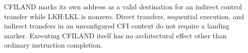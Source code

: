 CFILAND marks its own address as a valid destination for an indirect control transfer while LKH:LKL is nonzero. Direct transfers, sequential execution, and indirect transfers in an unconfigured CFI context do not require a landing marker. Executing CFILAND itself has no architectural effect other than ordinary instruction completion.

